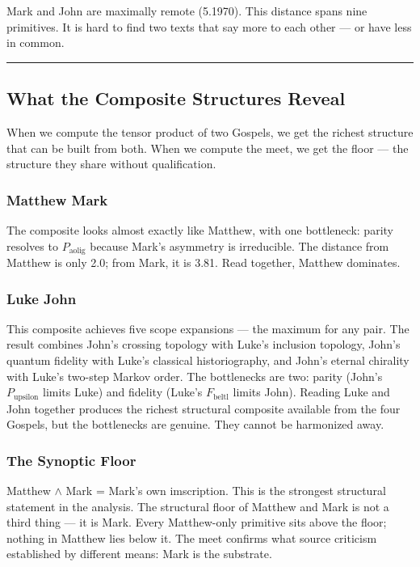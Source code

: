 \documentclass[12pt,a4paper]{article}
\begin{document}
Mark and John are maximally remote (5.1970). This distance spans nine primitives. It is hard to find two texts that say more to each other --- or have less in common.

\begin{center}
\rule{0.5\textwidth}{0.4pt}
\end{center}

\subsection{What the Composite Structures Reveal}

When we compute the tensor product of two Gospels, we get the richest structure that can be built from both. When we compute the meet, we get the floor --- the structure they share without qualification.

\subsubsection{Matthew \otimes Mark}

The composite looks almost exactly like Matthew, with one bottleneck: parity resolves to $P_{\text{aolig}}$ because Mark's asymmetry is irreducible. The distance from Matthew is only 2.0; from Mark, it is 3.81. Read together, Matthew dominates.

\subsubsection{Luke \otimes John}

This composite achieves five scope expansions --- the maximum for any pair. The result combines John's crossing topology with Luke's inclusion topology, John's quantum fidelity with Luke's classical historiography, and John's eternal chirality with Luke's two-step Markov order. The bottlenecks are two: parity (John's $P_{\text{upsilon}}$ limits Luke) and fidelity (Luke's $F_{\text{beltl}}$ limits John). Reading Luke and John together produces the richest structural composite available from the four Gospels, but the bottlenecks are genuine. They cannot be harmonized away.

\subsubsection{The Synoptic Floor}

Matthew $\land$ Mark = Mark's own imscription. This is the strongest structural statement in the analysis. The structural floor of Matthew and Mark is not a third thing --- it is Mark. Every Matthew-only primitive sits above the floor; nothing in Matthew lies below it. The meet confirms what source criticism established by different means: Mark is the substrate.
\end{document}
